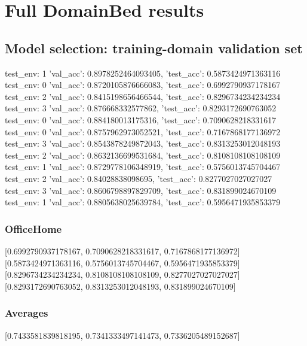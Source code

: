 \documentclass{article}
\begin{document}
\section{Full DomainBed results}

\subsection{Model selection: training-domain validation set}
test_env: 1
{'val_acc': 0.8978252464093405, 'test_acc': 0.5873424971363116}
test_env: 0
{'val_acc': 0.8720105876666083, 'test_acc': 0.6992790937178167}
test_env: 2
{'val_acc': 0.8415198656466544, 'test_acc': 0.8296734234234234}
test_env: 3
{'val_acc': 0.876668332577862, 'test_acc': 0.8293172690763052}
test_env: 0
{'val_acc': 0.884180013175316, 'test_acc': 0.7090628218331617}
test_env: 0
{'val_acc': 0.8757962973052521, 'test_acc': 0.7167868177136972}
test_env: 3
{'val_acc': 0.8543878249872043, 'test_acc': 0.8313253012048193}
test_env: 2
{'val_acc': 0.8632136699531684, 'test_acc': 0.8108108108108109}
test_env: 1
{'val_acc': 0.8729778106348919, 'test_acc': 0.5756013745704467}
test_env: 2
{'val_acc': 0.84028838098695, 'test_acc': 0.8277027027027027}
test_env: 3
{'val_acc': 0.8606798897829709, 'test_acc': 0.831899024670109}
test_env: 1
{'val_acc': 0.8805638025639784, 'test_acc': 0.5956471935853379}

\subsubsection{OfficeHome}
[0.6992790937178167, 0.7090628218331617, 0.7167868177136972]
[0.5873424971363116, 0.5756013745704467, 0.5956471935853379]
[0.8296734234234234, 0.8108108108108109, 0.8277027027027027]
[0.8293172690763052, 0.8313253012048193, 0.831899024670109]

\begin{center}
\end{center}

\subsubsection{Averages}
[0.7433581839818195, 0.7341333497141473, 0.7336205489152687]

\begin{center}
\end{center}
\end{document}
